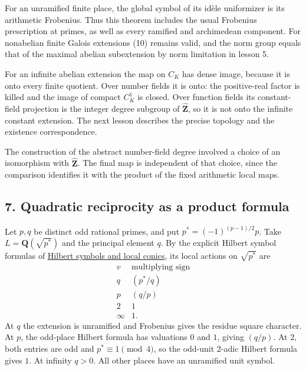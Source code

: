 \documentclass[11pt,a4paper]{article}
\begin{document}
For an unramified finite place, the global symbol of its idèle
uniformizer is its arithmetic Frobenius. Thus this theorem includes the
usual Frobenius prescription at primes, as well as every ramified and
archimedean component. For nonabelian finite Galois extensions (10)
remains valid, and the norm group equals that of the maximal abelian
subextension by norm limitation in lesson 5.

For an infinite abelian extension the map on \(C_K\) has dense image,
because it is onto every finite quotient. Over number fields it is onto:
the positive-real factor is killed and the image of compact \(C_K^1\) is
closed. Over function fields its constant-field projection is the
integer degree subgroup of \(\widehat{\mathbf Z}\), so it is not onto
the infinite constant extension. The next lesson describes the precise
topology and the existence correspondence.

The construction of the abstract number-field degree involved a choice
of an isomorphism with \(\widehat{\mathbf Z}\). The final map is
independent of that choice, since the comparison identifies it with the
product of the fixed arithmetic local maps.

\subsection{7. Quadratic reciprocity as a product
formula}\label{quadratic-reciprocity-as-a-product-formula}

Let \(p,q\) be distinct odd rational primes, and put
\(p^*=(-1)^{(p-1)/2}p\). Take \(L=\mathbf Q(\sqrt{p^*})\) and the
principal element \(q\). By the explicit Hilbert symbol formulas of
\href{../hilbert-symbols-and-local-conics.html}{Hilbert symbols and
local conics}, its local actions on \(\sqrt{p^*}\) are \[
\begin{array}{c|c}
v&\text{multiplying sign}\\ \hline
q&(p^*/q)\\
p&(q/p)\\
2&1\\
\infty&1.
\end{array}
\tag{16}
\] At \(q\) the extension is unramified and Frobenius gives the residue
square character. At \(p\), the odd-place Hilbert formula has valuations
\(0\) and \(1\), giving \((q/p)\). At \(2\), both entries are odd and
\(p^*\equiv1\pmod4\), so the odd-unit \(2\)-adic Hilbert formula gives
\(1\). At infinity \(q>0\). All other places have an unramified unit
symbol.
\end{document}
